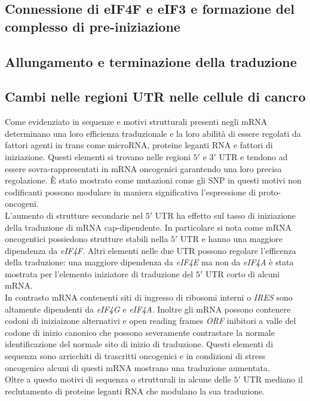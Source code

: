 	\subsection{Connessione di eIF4F e eIF3 e formazione del complesso di pre-iniziazione}

	\subsection{Allungamento e terminazione della traduzione}


	\subsection{Cambi nelle regioni UTR nelle cellule di cancro}
	Come evidenziato in \cite{tranconcancer} sequenze e motivi strutturali presenti negli mRNA determinano una loro efficienza traduzionale e la loro abilit\`a di essere regolati da fattori agenti in trans come microRNA, proteine leganti RNA e fattori di iniziazione.
	Questi elementi si trovano nelle regioni $5'$ e $3'$ UTR e tendono ad essere sovra-rappresentati in mRNA oncogenici garantendo una loro precisa regolazione.
	\`E stato mostrato come mutazioni come gli SNP in questi motivi non codificanti possono modulare in maniera significativa l'espressione di proto-oncogeni.\\
	L'aumento di strutture secondarie nel $5'$ UTR ha effetto sul tasso di iniziazione della traduzione di mRNA cap-dipendente.
	In particolare si nota come mRNA oncogentici possiedono strutture stabili nella $5'$ UTR e hanno una maggiore dipendenza da \emph{eIF4F}.
	Altri elementi nelle due UTR possono regolare l'efficenza della traduzione: una maggiore dipendenza da \emph{eIF4E} ma non da \emph{eIF4A} \`e stata mostrata per l'elemento iniziatore di traduzione del $5'$ UTR corto di alcuni mRNA.\\
	In contrasto mRNA contenenti siti di ingresso di ribosomi interni o \emph{IRES} sono altamente dipendenti da \emph{eIF4G} e \emph{eIF4A}.
	Inoltre gli mRNA possono contenere codoni di iniziaizone alternativi e open reading frames \emph{ORF} inibitori a valle del codone di inizio canonico che possono severamente contrastare la normale identificazione del normale sito di inizio di traduzione.
	Questi elementi di sequenza sono arricchiti di trascritti oncogenici e in condizioni di stress oncogenico alcuni di questi mRNA mostrano una traduzione aumentata.\\
	Oltre a questo motivi di sequenza o strutturali in alcune delle $5'$ UTR mediano il reclutamento di proteine leganti RNA che modulano la sua traduzione.
